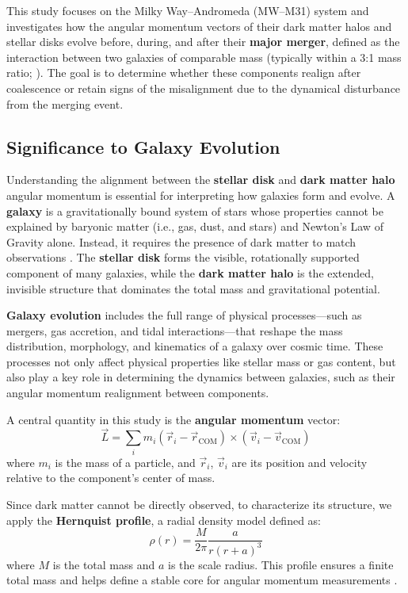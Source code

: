 \documentclass[twocolumn]{aastex631}
\begin{document}
This study focuses on the Milky Way–Andromeda (MW–M31) system and investigates how the angular momentum vectors of their dark matter halos and stellar disks evolve before, during, and after their \textbf{major merger}, defined as the interaction between two galaxies of comparable mass (typically within a 3:1 mass ratio; \citealt{Lotz2011}). The goal is to determine whether these components realign after coalescence or retain signs of the misalignment due to the dynamical disturbance from the merging event.


\subsection{Significance to Galaxy Evolution}

Understanding the alignment between the \textbf{stellar disk} and \textbf{dark matter halo} angular momentum is essential for interpreting how galaxies form and evolve. A \textbf{galaxy} is a gravitationally bound system of stars whose properties cannot be explained by baryonic matter (i.e., gas, dust, and stars) and Newton's Law of Gravity alone. Instead, it requires the presence of dark matter to match observations \citep{Willman2012}. The \textbf{stellar disk} forms the visible, rotationally supported component of many galaxies, while the \textbf{dark matter halo} is the extended, invisible structure that dominates the total mass and gravitational potential.

\textbf{Galaxy evolution} includes the full range of physical processes—such as mergers, gas accretion, and tidal interactions—that reshape the mass distribution, morphology, and kinematics of a galaxy over cosmic time. These processes not only affect physical properties like stellar mass or gas content, but also play a key role in determining the dynamics between galaxies, such as their angular momentum realignment between components.

A central quantity in this study is the \textbf{angular momentum} vector:
\[\vec{L} = \sum_i m_i (\vec{r}_i - \vec{r}_{\text{COM}}) \times (\vec{v}_i - \vec{v}_{\text{COM}})\]
where $m_i$ is the mass of a particle, and $\vec{r}_i$, $\vec{v}_i$ are its position and velocity relative to the component’s center of mass.

Since dark matter cannot be directly observed, to characterize its structure, we apply the \textbf{Hernquist profile}, a radial density model defined as:
\[\rho(r) = \frac{M}{2\pi} \frac{a}{r(r+a)^3}\]
where $M$ is the total mass and $a$ is the scale radius. This profile ensures a finite total mass and helps define a stable core for angular momentum measurements \citep{Hernquist1990}.
\end{document}
